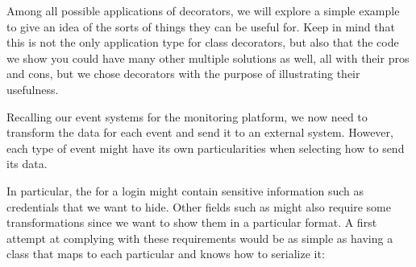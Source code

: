\documentclass[a4paper,10pt,english]{sphinxmanual}
\begin{document}
Among all possible applications of decorators, we will explore a simple example to give an
idea of the sorts of things they can be useful for. Keep in mind that this is not the only
application type for class decorators, but also that the code we show you could have many
other multiple solutions as well, all with their pros and cons, but we chose decorators with
the purpose of illustrating their usefulness.

Recalling our event systems for the monitoring platform, we now need to transform the
data for each event and send it to an external system. However, each type of event might
have its own particularities when selecting how to send its data.

In particular, the  for a login might contain sensitive information such as credentials
that we want to hide. Other fields such as  might also require some
transformations since we want to show them in a particular format. A first attempt at
complying with these requirements would be as simple as having a class that maps to each
particular  and knows how to serialize it:
\end{document}

